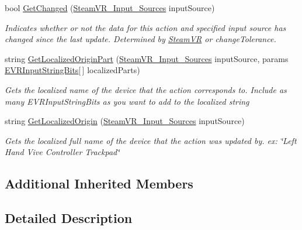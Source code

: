 \begin{DoxyCompactItemize}
bool \mbox{\hyperlink{interface_valve_1_1_v_r_1_1_i_steam_v_r___action___in_acfd82f764ece664bc376e638fe440dfd}{Get\+Changed}} (\mbox{\hyperlink{namespace_valve_1_1_v_r_a82e5bf501cc3aa155444ee3f0662853f}{Steam\+V\+R\+\_\+\+Input\+\_\+\+Sources}} input\+Source)
\begin{DoxyCompactList}\small\item\em Indicates whether or not the data for this action and specified input source has changed since the last update. Determined by \mbox{\hyperlink{class_valve_1_1_v_r_1_1_steam_v_r}{Steam\+VR}} or \textquotesingle{}change\+Tolerance\textquotesingle{}. \end{DoxyCompactList}\item 
string \mbox{\hyperlink{interface_valve_1_1_v_r_1_1_i_steam_v_r___action___in_aa4ff7b17b61ea2e9ab5fe8421ed5e877}{Get\+Localized\+Origin\+Part}} (\mbox{\hyperlink{namespace_valve_1_1_v_r_a82e5bf501cc3aa155444ee3f0662853f}{Steam\+V\+R\+\_\+\+Input\+\_\+\+Sources}} input\+Source, params \mbox{\hyperlink{namespace_valve_1_1_v_r_a05e76187bbc5846b9bfb44f6acf13912}{E\+V\+R\+Input\+String\+Bits}}\mbox{[}$\,$\mbox{]} localized\+Parts)
\begin{DoxyCompactList}\small\item\em Gets the localized name of the device that the action corresponds to. Include as many E\+V\+R\+Input\+String\+Bits as you want to add to the localized string \end{DoxyCompactList}\item 
string \mbox{\hyperlink{interface_valve_1_1_v_r_1_1_i_steam_v_r___action___in_a13a0e2e6f5ceb7ea67542364e203b383}{Get\+Localized\+Origin}} (\mbox{\hyperlink{namespace_valve_1_1_v_r_a82e5bf501cc3aa155444ee3f0662853f}{Steam\+V\+R\+\_\+\+Input\+\_\+\+Sources}} input\+Source)
\begin{DoxyCompactList}\small\item\em Gets the localized full name of the device that the action was updated by. ex\+: \char`\"{}\+Left Hand Vive Controller Trackpad\char`\"{} \end{DoxyCompactList}\end{DoxyCompactItemize}
\subsection*{Additional Inherited Members}


\subsection{Detailed Description}



